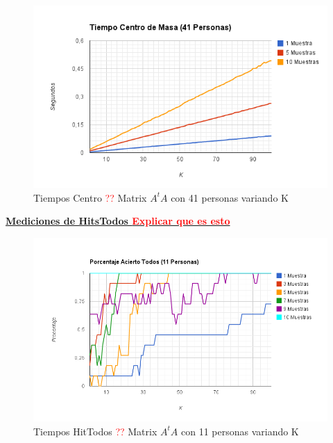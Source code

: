 \begin{figure}[H]
\includegraphics[width=1\textwidth]{img/imagei.png}
     \caption{Tiempos Centro \textcolor{red}{??} Matrix $A^tA$ con 41 personas variando K}
     \label{fig:figura1}
\end{figure}


\underline{\textbf{Mediciones de HitsTodos \textcolor{red}{Explicar que es esto}}}

\begin{figure}[H]
\includegraphics[width=1\textwidth]{img/imagej.png}
     \caption{Tiempos HitTodos \textcolor{red}{??} Matrix $A^tA$ con 11 personas variando K}
     \label{fig:figura1}
\end{figure}

